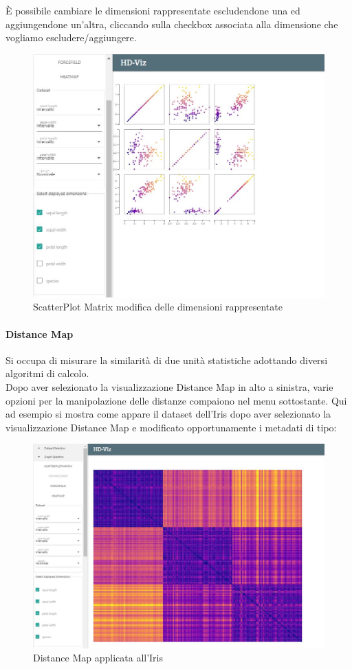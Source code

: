 \documentclass[../manuale_utente.tex]{subfiles}
\begin{document}
È possibile cambiare le dimensioni rappresentate escludendone una ed aggiungendone un'altra, cliccando sulla checkbox associata alla dimensione che vogliamo escludere/aggiungere.

\begin{figure}[H]
	\centering
	\includegraphics[width=18cm]{src/img/spm/spm_cambio_dim.jpg}
	\caption{ScatterPlot Matrix modifica delle dimensioni rappresentate}
\end{figure}


\paragraph{Distance Map}
    \label{par:vis_distance}
Si occupa di misurare la similarità di due unità statistiche adottando diversi algoritmi di calcolo.\\
Dopo aver selezionato la visualizzazione Distance Map in alto a sinistra, varie opzioni per la manipolazione delle distanze compaiono nel menu sottostante. Qui ad esempio si mostra come appare il dataset dell'Iris
dopo aver selezionato la visualizzazione Distance Map e modificato opportunamente i metadati di tipo:

\begin{figure}[H]
	\centering
	\includegraphics[width=18cm]{src/img/dm/iris_base_dm.jpg}
	\caption{Distance Map applicata all'Iris}
\end{figure}
\end{document}
